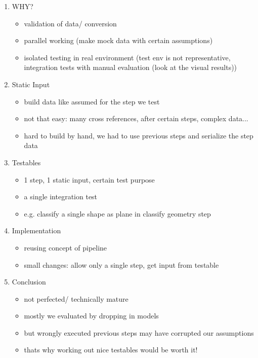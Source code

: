 \documentclass[../ClassicThesis.tex]{subfiles}
\begin{document}
\begin{enumerate}
\item WHY?
  \begin{itemize}
  \item validation of data/ conversion
  \item parallel working (make mock data with certain assumptions)
  \item isolated testing in real environment (test env is not representative,
    integration tests with manual evaluation (look at the visual results))
  \end{itemize}

\item Static Input
  \begin{itemize}
  \item build data like assumed for the step we test
  \item not that easy: many cross references, after certain steps, complex
    data...
  \item hard to build by hand, we had to use previous steps and serialize the
    step data
  \end{itemize}

\item Testables
  \begin{itemize}
  \item 1 step, 1 static input, certain test purpose
  \item a single integration test
  \item e.g. classify a single shape as plane in classify geometry step
  \end{itemize}

\item Implementation
  \begin{itemize}
  \item reusing concept of pipeline
  \item small changes: allow only a single step, get input from testable
  \end{itemize}

\item Conclusion
  \begin{itemize}
  \item not perfected/ technically mature
  \item mostly we evaluated by dropping in models
  \item but wrongly executed previous steps may have corrupted our assumptions
  \item thats why working out nice testables would be worth it!
  \end{itemize}
\end{enumerate}
\end{document}
